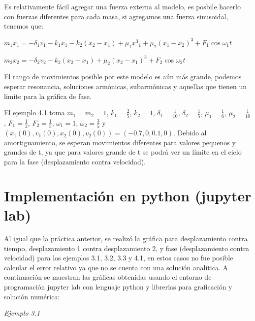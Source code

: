 \documentclass[a4paper]{article}
\begin{document}
Es relativamente fácil agregar una fuerza externa al modelo, es posbile hacerlo con fuerzas diferentes para cada masa, si agregamos una fuerza sinusoidal, tenemos que:

\begin{center}
	$m_1 \ddot{x}_1 = -{\delta}_1 v_1 - k_1 x_1 - k_2 (x_2 - x_1) + {\mu}_1 {x^3}_1 + {\mu}_2 (x_1 - x_2)^3 + F_1 \cos {\omega}_1 t$

	$m_2 \ddot{x}_2 = -{\delta}_2 v_2 -k_2 (x_2 - x_1) + {\mu}_2 (x_2 - x_1)^3 + F_2 \cos {\omega}_2 t$
\end{center}

El rango de movimientos posible por este modelo es aún más grande, podemos esperar resonancia, soluciones armónicas, subarmónicas y aquellas que tienen un limite para la gráfica de fase.

El ejemplo 4.1 toma $m_1 = m_2 = 1$,  $k_1 = \frac{2}{5}$, $k_2 = 1$, ${\delta}_1 = \frac{1}{10}$, ${\delta}_2 = \frac{1}{5}$, ${\mu}_1 = \frac{1}{6}$, ${\mu}_2 = \frac{1}{10}$, $F_1 = \frac{1}{3}$, $F_2 = \frac{1}{5}$, ${\omega}_1 = 1$, ${\omega}_2 = \frac{3}{5}$ y $(x_1(0),v_1(0),x_2(0),v_2(0)) = (-0.7,0,0.1,0)$. Debido al amortiguamiento, se esperan movimientos diferentes para valores pequenos y grandes de t, ya que para valores grande de t se podrá ver un límite en el ciclo para la fase (desplazamiento contra velocidad).


\section{Implementación en python (jupyter lab)}

Al igual que la práctica anterior, se realizó la gráfica para desplazamiento contra tiempo, desplazamiento 1 contra desplazamiento 2, y fase (desplazamiento contra velocidad) para los ejemplos 3.1, 3.2, 3.3 y 4.1, en estos casos no fue posible calcular el error relativo ya que no se cuenta con una solución analítica. A continuación se muestran las gráficas obtenidas usando el entorno de programación jupyter lab con lenguaje python y librerias para graficación y solución numérica:

\vspace{0.5cm}

\textit{Ejemplo 3.1}
\end{document}
